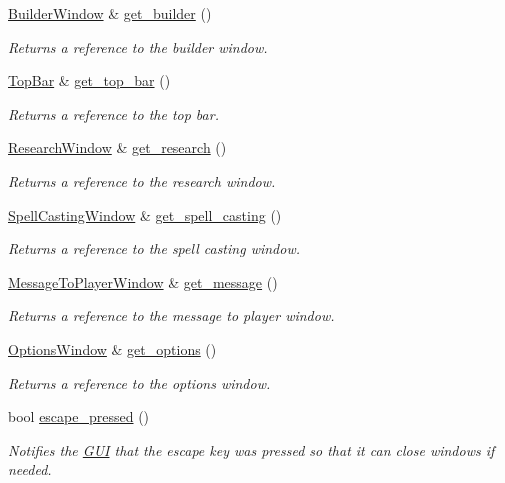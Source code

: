 \begin{DoxyCompactItemize}
\hyperlink{class_builder_window}{Builder\+Window} \& \hyperlink{class_g_u_i_a3533e8d1c67c8cd1643be0b6d640e489}{get\+\_\+builder} ()
\begin{DoxyCompactList}\small\item\em Returns a reference to the builder window. \end{DoxyCompactList}\item 
\hyperlink{class_top_bar}{Top\+Bar} \& \hyperlink{class_g_u_i_a57b2102ded949460275f6c06a73ef472}{get\+\_\+top\+\_\+bar} ()
\begin{DoxyCompactList}\small\item\em Returns a reference to the top bar. \end{DoxyCompactList}\item 
\hyperlink{class_research_window}{Research\+Window} \& \hyperlink{class_g_u_i_a8f8dae1e40b3f25c179cd088631e9e24}{get\+\_\+research} ()
\begin{DoxyCompactList}\small\item\em Returns a reference to the research window. \end{DoxyCompactList}\item 
\hyperlink{class_spell_casting_window}{Spell\+Casting\+Window} \& \hyperlink{class_g_u_i_ad68dfd48d702edbc8eae79b02ef694db}{get\+\_\+spell\+\_\+casting} ()
\begin{DoxyCompactList}\small\item\em Returns a reference to the spell casting window. \end{DoxyCompactList}\item 
\hyperlink{class_message_to_player_window}{Message\+To\+Player\+Window} \& \hyperlink{class_g_u_i_af7f76a45f16144b8217938de6facb97d}{get\+\_\+message} ()
\begin{DoxyCompactList}\small\item\em Returns a reference to the message to player window. \end{DoxyCompactList}\item 
\hyperlink{class_options_window}{Options\+Window} \& \hyperlink{class_g_u_i_adf043e9ed8ec60a8ac7f981dbd3d7933}{get\+\_\+options} ()
\begin{DoxyCompactList}\small\item\em Returns a reference to the options window. \end{DoxyCompactList}\item 
bool \hyperlink{class_g_u_i_a8c3e6a481d74bb0673389b596989047c}{escape\+\_\+pressed} ()
\begin{DoxyCompactList}\small\item\em Notifies the \hyperlink{class_g_u_i}{G\+UI} that the escape key was pressed so that it can close windows if needed. \end{DoxyCompactList}\item 

\end{DoxyCompactItemize}
